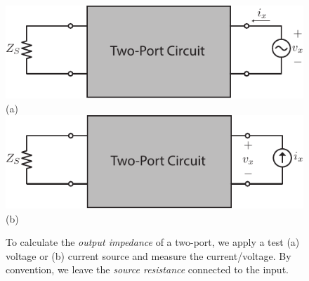 \begin{figure}[H]
\centering
\includegraphics[width=.85\columnwidth]{2port_zout_vx}\\
(a)\\
\includegraphics[width=.85\columnwidth]{2port_zout_ix}\\
(b)\\
\caption{To calculate the \textit{output impedance} of a two-port, we apply a test (a) voltage or (b) current source and measure the current/voltage.  By convention, we leave the \textit{source resistance} connected to the input.}
\label{fig:2port_zout_vx}
\end{figure}
\newpage
